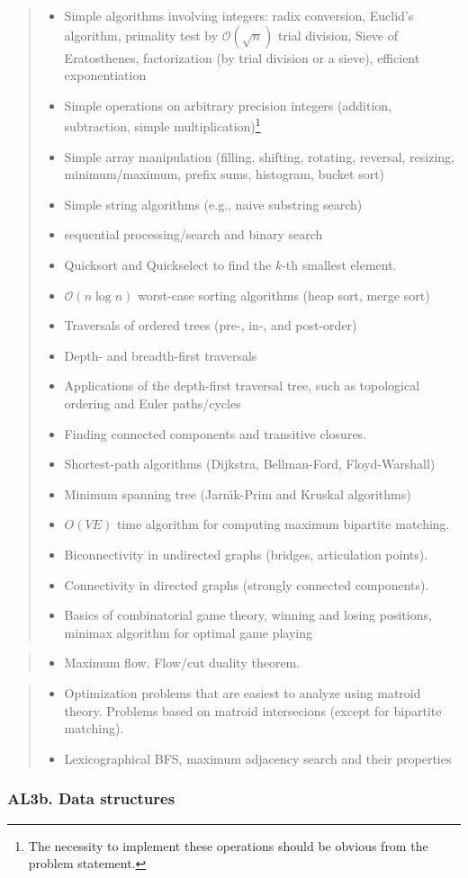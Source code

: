 \documentclass[a4paper,11pt,oneside]{article}
\newcommand{\cmark}{\ding{51}}%
\newcommand{\xmark}{\ding{55}}%
\newcommand{\CC}[1]{#1}
\newcommand{\Ccodeonly}{{\small\cmark\faFileText}}
\newcommand{\Cexmaybe}{{\small\xmark\faQuestionCircle}}
\newcommand{\Cexcluded}{{\small\xmark}}
\newcommand{\Icodeonly}{\item[\hbox to 1.8em{\Ccodeonly\hfill}]}
\newcommand{\Iexmaybe}{\item[\hbox to 1.8em{\Cexmaybe\hfill}]}
\newcommand{\Iexcluded}{\item[\hbox to 1.8em{\Cexcluded\hfill}]}
\newenvironment{myitemize}{\begin{quote}\begin{itemize}\itemsep 0pt}{\end{itemize}\end{quote}}
\begin{document}
    \begin{myitemize}
    \Icodeonly Simple algorithms involving integers: radix conversion, Euclid's algorithm, primality test by $\mathcal{O}(\sqrt{n})$ trial division, Sieve of Eratosthenes, factorization (by trial division or a sieve), efficient exponentiation
    \Icodeonly Simple operations on arbitrary precision integers (addition, subtraction, simple multiplication)\footnote{The necessity to implement these operations should be obvious from the problem statement.}
    \Icodeonly Simple array manipulation (filling, shifting, rotating, reversal, resizing, minimum/maximum, prefix sums, histogram, bucket sort)
    \Icodeonly Simple string algorithms (e.g., naive substring search)
    \Icodeonly\CC{sequential} processing/search \CC{and binary search}
    \Icodeonly \CC{Quicksort} and Quickselect to find the $k$-th smallest element.
    \Icodeonly\CC{$\mathcal{O}(n \log n)$} worst-case \CC{sorting algorithms (heap sort, merge sort)}
    \Icodeonly Traversals of ordered trees (pre-, in-, and post-order)
    \Icodeonly\CC{Depth- and breadth-first traversals}
    \Icodeonly Applications of the depth-first traversal tree, such as topological ordering and Euler paths/cycles
    \Icodeonly Finding connected components and transitive closures.
    \Icodeonly Shortest-path algorithms (Dijkstra, Bellman-Ford, Floyd-Warshall)
    \Icodeonly Minimum spanning tree (Jarn\'\i k-Prim and Kruskal algorithms)
    \Icodeonly $O(VE)$ time algorithm for computing maximum bipartite matching.
    \Icodeonly Biconnectivity in undirected graphs (bridges, articulation points).
    \Icodeonly Connectivity in directed graphs (strongly connected components).
    \Icodeonly Basics of combinatorial game theory, winning and losing positions, minimax algorithm for optimal game playing
    \end{myitemize}

    \begin{myitemize}
    \Iexmaybe Maximum flow. Flow/cut duality theorem.
    \end{myitemize}

    \begin{myitemize}
    \Iexcluded Optimization problems that are easiest to analyze using matroid theory. Problems based on matroid intersecions (except for bipartite matching).
    \Iexcluded Lexicographical BFS, maximum adjacency search and their properties
    \end{myitemize}
 
    \subsubsection*{AL3b. Data structures}%
  
\end{document}
